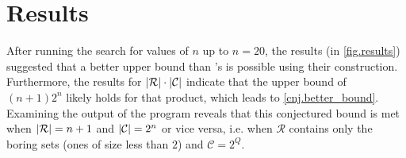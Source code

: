 \documentclass{report}
\DeclarePairedDelimiter{\abs}{\lvert}{\rvert}
\theoremstyle{definition}
\begin{document}
\section{Results}

After running the search for values of $n$ up to $n = 20$, the results
(in \cref{fig.results}) suggested that a better upper bound than
\cite{UFA_UB}'s is possible using their construction. Furthermore,
the results for $\abs{\mathcal{R}} \cdot \abs{\mathcal{C}}$ indicate that
the upper bound of $(n + 1) 2^n$ likely holds for that product,
which leads to \cref{cnj.better_bound}. Examining the output of the program
reveals that this conjectured bound is met when $\abs{\mathcal{R}} = n + 1$
and $\abs{\mathcal{C}} = 2^n$ or vice versa, i.e. when $\mathcal{R}$ contains
only the boring sets (ones of size less than $2$) and $\mathcal{C} = 2^Q$.
\end{document}
